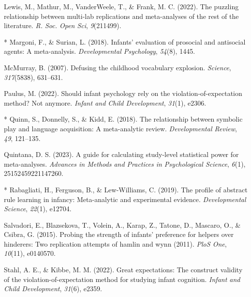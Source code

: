 \documentclass[10pt, letterpaper]{article}
\newenvironment{CSLReferences}%
  {}%
  {\par}
\begin{document}
\begin{CSLReferences}
\leavevmode{}%
Lewis, M., Mathur, M., VanderWeele, T., \& Frank, M. C. (2022). The
puzzling relationship between multi-lab replications and meta-analyses
of the rest of the literature. \emph{R. Soc. Open Sci},
\emph{9}(211499).

\leavevmode{}%
* Margoni, F., \& Surian, L. (2018). Infants' evaluation of prosocial
and antisocial agents: A meta-analysis. \emph{Developmental Psychology},
\emph{54}(8), 1445.

\leavevmode{}%
McMurray, B. (2007). Defusing the childhood vocabulary explosion.
\emph{Science}, \emph{317}(5838), 631--631.

\leavevmode{}%
Paulus, M. (2022). Should infant psychology rely on the
violation-of-expectation method? Not anymore. \emph{Infant and Child
Development}, \emph{31}(1), e2306.

\leavevmode{}%
* Quinn, S., Donnelly, S., \& Kidd, E. (2018). The relationship between
symbolic play and language acquisition: A meta-analytic review.
\emph{Developmental Review}, \emph{49}, 121--135.

\leavevmode{}%
Quintana, D. S. (2023). A guide for calculating study-level statistical
power for meta-analyses. \emph{Advances in Methods and Practices in
Psychological Science}, \emph{6}(1), 25152459221147260.

\leavevmode{}%
* Rabagliati, H., Ferguson, B., \& Lew-Williams, C. (2019). The profile
of abstract rule learning in infancy: Meta-analytic and experimental
evidence. \emph{Developmental Science}, \emph{22}(1), e12704.

\leavevmode{}%
Salvadori, E., Blazsekova, T., Volein, A., Karap, Z., Tatone, D.,
Mascaro, O., \& Csibra, G. (2015). Probing the strength of infants'
preference for helpers over hinderers: Two replication attempts of
hamlin and wynn (2011). \emph{PloS One}, \emph{10}(11), e0140570.

\leavevmode{}%
Stahl, A. E., \& Kibbe, M. M. (2022). Great expectations: The construct
validity of the violation-of-expectation method for studying infant
cognition. \emph{Infant and Child Development}, \emph{31}(6), e2359.


\end{CSLReferences}
\end{document}
